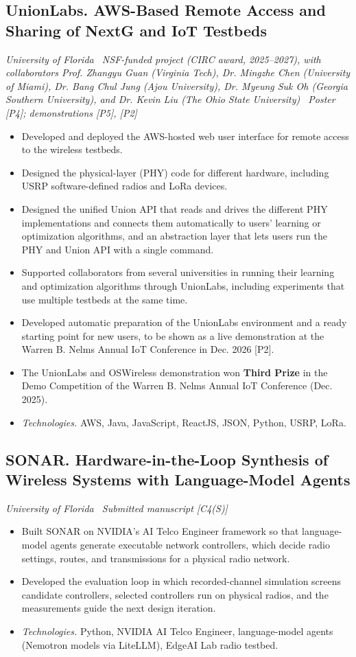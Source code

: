 \documentclass[10pt]{article}
\newcommand{\proj}[2]{\subsection*{#1}{\small\itshape #2}\par}
\newcommand{\tech}[1]{\item \textit{Technologies.} #1}
\begin{document}
\proj{UnionLabs. AWS-Based Remote Access and Sharing of NextG and IoT Testbeds}{University of Florida \textbullet\ NSF-funded project (CIRC award, 2025--2027), with collaborators Prof. Zhangyu Guan (Virginia Tech), Dr. Mingzhe Chen (University of Miami), Dr. Bang Chul Jung (Ajou University), Dr. Myeung Suk Oh (Georgia Southern University), and Dr. Kevin Liu (The Ohio State University) \textbullet\ Poster [P4]; demonstrations [P5], [P2]}
\begin{itemize}
\item Developed and deployed the AWS-hosted web user interface for remote access to the wireless testbeds.
\item Designed the physical-layer (PHY) code for different hardware, including USRP software-defined radios and LoRa devices.
\item Designed the unified Union API that reads and drives the different PHY implementations and connects them automatically to users' learning or optimization algorithms, and an abstraction layer that lets users run the PHY and Union API with a single command.
\item Supported collaborators from several universities in running their learning and optimization algorithms through UnionLabs, including experiments that use multiple testbeds at the same time.
\item Developed automatic preparation of the UnionLabs environment and a ready starting point for new users, to be shown as a live demonstration at the Warren B. Nelms Annual IoT Conference in Dec. 2026 [P2].
\item The UnionLabs and OSWireless demonstration won \textbf{Third Prize} in the Demo Competition of the Warren B. Nelms Annual IoT Conference (Dec. 2025).
\tech{AWS, Java, JavaScript, ReactJS, JSON, Python, USRP, LoRa.}
\end{itemize}

\proj{SONAR. Hardware-in-the-Loop Synthesis of Wireless Systems with Language-Model Agents}{University of Florida \textbullet\ Submitted manuscript [C4(S)]}
\begin{itemize}
\item Built SONAR on NVIDIA's AI Telco Engineer framework so that language-model agents generate executable network controllers, which decide radio settings, routes, and transmissions for a physical radio network.
\item Developed the evaluation loop in which recorded-channel simulation screens candidate controllers, selected controllers run on physical radios, and the measurements guide the next design iteration.
\tech{Python, NVIDIA AI Telco Engineer, language-model agents (Nemotron models via LiteLLM), EdgeAI Lab radio testbed.}
\end{itemize}
\end{document}
